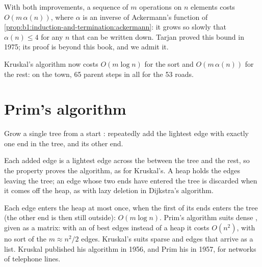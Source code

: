 With both improvements, a sequence of $m$ operations on $n$ elements costs $O(m\, \alpha(n))$, where $\alpha$ is an
inverse of Ackermann's function of \cref{prop:b1:induction-and-termination:ackermann}: it grows so slowly that
$\alpha(n) \leq 4$ for any $n$ that can be written down. Tarjan proved this bound in 1975; its proof is beyond this
book, and we admit it.

\label{out:b1:spanning-trees:fast}

Kruskal's algorithm now costs $O(m \log n)$ for the sort and $O(m\, \alpha(n))$ for the rest: on the town, 65 parent
steps in all for the 53 roads.

\section{Prim's algorithm}\label{sec:b1:spanning-trees:prim}

\begin{method}\label{met:b1:spanning-trees:prim}
Grow a single tree from a start : repeatedly add the lightest edge with exactly one end in the tree, and its
other end.
\end{method}

Each added edge is a lightest edge across the  between the tree and the rest, so the  property proves the
algorithm, as for Kruskal's. A heap holds the edges leaving the tree; an edge whose two ends have entered the tree is
discarded when it comes off the heap, as with lazy deletion in Dijkstra's algorithm.

\label{lst:b1:spanning-trees:prim}

\label{out:b1:spanning-trees:prim}

Each edge enters the heap at most once, when the first of its ends enters the tree (the other end is then still
outside): $O(m \log n)$. Prim's algorithm suits dense , given as a matrix: with an
 of best edges instead of a heap it costs $O(n^2)$, with no sort of the $m \approx n^2 / 2$ edges. Kruskal's
suits sparse  and edges that arrive as a list. Kruskal published his algorithm in 1956, and Prim his in 1957, for
networks of telephone lines.

